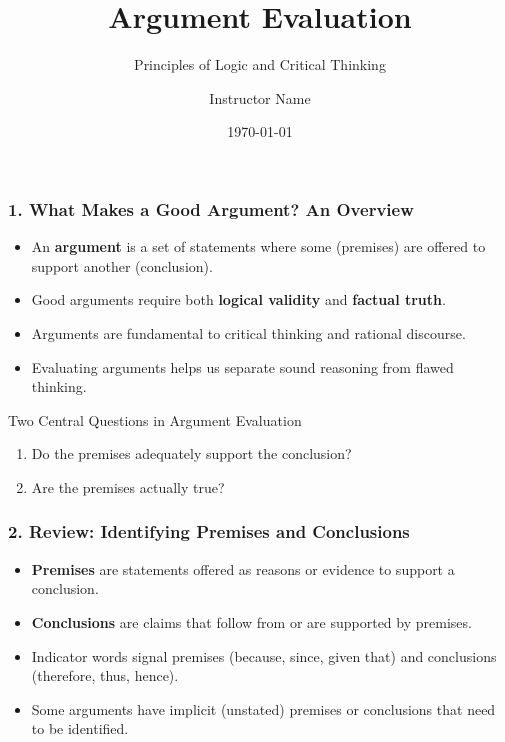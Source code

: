 \documentclass{beamer}
\title{Argument Evaluation}
\subtitle{Principles of Logic and Critical Thinking}
\author{Instructor Name}
\date{\today}
\begin{document}
\begin{frame}
\titlepage
\end{frame}

\begin{frame}
\frametitle{1. What Makes a Good Argument? An Overview}
\begin{itemize}
\item An \textbf{argument} is a set of statements where some (premises) are offered to support another (conclusion).
\item Good arguments require both \textbf{logical validity} and \textbf{factual truth}.
\item Arguments are fundamental to critical thinking and rational discourse.
\item Evaluating arguments helps us separate sound reasoning from flawed thinking.
\end{itemize}

\begin{block}{Two Central Questions in Argument Evaluation}
\begin{enumerate}
\item Do the premises adequately support the conclusion?
\item Are the premises actually true?
\end{enumerate}
\end{block}
\end{frame}

\begin{frame}
\frametitle{2. Review: Identifying Premises and Conclusions}
\begin{itemize}
\item \textbf{Premises} are statements offered as reasons or evidence to support a conclusion.
\item \textbf{Conclusions} are claims that follow from or are supported by premises.
\item Indicator words signal premises (because, since, given that) and conclusions (therefore, thus, hence).
\item Some arguments have implicit (unstated) premises or conclusions that need to be identified.
\end{itemize}

\end{frame}
\end{document}
